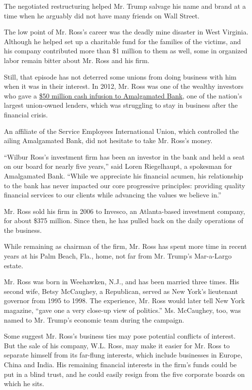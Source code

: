 The negotiated restructuring helped Mr. Trump salvage his name and brand
at a time when he arguably did not have many friends on Wall Street.

The low point of Mr. Ross's career was the deadly mine disaster in West
Virginia. Although he helped set up a charitable fund for the families
of the victims, and his company contributed more than \$1 million to
them as well, some in organized labor remain bitter about Mr. Ross and
his firm.

Still, that episode has not deterred some unions from doing business
with him when it was in their interest. In 2012, Mr. Ross was one of the
wealthy investors who gave a
\href{http://dealbook.nytimes3xbfgragh.onion/2014/08/01/at-union-owned-amalgamated-bank-new-chief-charts-a-progressive-course/}{\$50
million cash infusion to Amalgamated Bank}, one of the nation's largest
union-owned lenders, which was struggling to stay in business after the
financial crisis.

An affiliate of the Service Employees International Union, which
controlled the ailing Amalgamated Bank, did not hesitate to take Mr.
Ross's money.

``Wilbur Ross's investment firm has been an investor in the bank and
held a seat on our board for nearly five years,'' said Loren
Riegelhaupt, a spokesman for Amalgamated Bank. ``While we appreciate his
financial acumen, his relationship to the bank has never impacted our
core progressive principles: providing quality financial services to our
clients while advancing the values we believe in.''

Mr. Ross sold his firm in 2006 to Invesco, an Atlanta-based investment
company, for about \$375 million. Since then, he has pulled back on the
daily operations of the business.

While remaining as chairman of the firm, Mr. Ross has spent more time in
recent years at his Palm Beach, Fla., home, not far from Mr. Trump's
Mar-a-Largo estate.

Mr. Ross was born in Weehawken, N.J., and has been married three times.
His second wife, Betsy McCaughey, a Republican, served as New York's
lieutenant governor from 1995 to 1998. The experience, Mr. Ross would
later tell New York magazine, ``gave one a very close-up view of
politics.'' Ms. McCaughey, too, was named to Mr. Trump's economic team
during the campaign.

Some suggest Mr. Ross's business ties may pose potential conflicts of
interest. But the sale of his company, W.L. Ross, may make it easier for
Mr. Ross to separate himself from its far-flung interests, which include
businesses in Europe, China and India. His remaining financial interests
in the firm's funds could be put in a blind trust, and he could easily
resign from the five corporate boards on which he sits.

